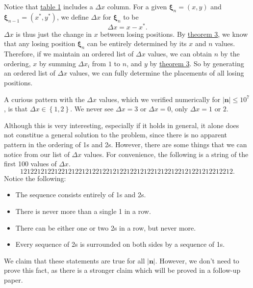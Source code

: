 \documentclass[11pt, letterpaper]{article}
\begin{document}
Notice that \hyperref[tab:1]{table 1} includes a $\Delta x$ column. For a given $\boldsymbol{\xi} _n=(x,y)$ and $\boldsymbol{\xi} _{n-1}=(x^*,y^*)$, we define $\Delta x$ for $\boldsymbol{\xi} _n$ to be
\[
	\Delta x=x-x^*
.\]
$ \Delta x$ is thus just the change in $x$ between losing positions. By \hyperref[thm:3]{theorem 3}, we know that any losing position $\boldsymbol{\xi} _n$ can be entirely determined by its $x$ and $n$ values. Therefore, if we maintain an ordered list of $\Delta x$ values, we can obtain $n$ by the ordering, $x$ by summing $\Delta x_i$ from $1$ to $n$, and $y$ by \hyperref[thm:3]{theorem 3}. So by generating an ordered list of $\Delta x$ values, we can fully determine the placements of all losing positions.

A curious pattern with the $\Delta x$ values, which we verified numerically for $\left| \mathbf{n} \right| \leq 10^7$, is that $\Delta x\in\left\{ 1,2 \right\} $. We never see $\Delta x=3$ or $\Delta x=0$, only $\Delta x=1$ or $2$.

Although this is very interesting, especially if it holds in general, it alone does not constitue a general solution to the problem, since there is no apparent pattern in the ordering of 1s and 2s. However, there are some things that we can notice from our list of $\Delta x$ values. For convenience, the following is a string of the first 100 values of $\Delta x$.
\[
	12122121221221212212122122121221221212212122122121221212212212
.\]
Notice the following:
\begin{itemize}
	\item The sequence consists entirely of 1s and 2s.
	\item There is never more than a single 1 in a row.
	\item There can be either one or two 2s in a row, but never more.
	\item Every sequence of 2s is surrounded on both sides by a sequence of 1s.
\end{itemize}
We claim that these statements are true for all $\left| \mathbf{n} \right| $. However, we don't need to prove this fact, as there is a stronger claim which will be proved in a follow-up paper.
\end{document}
